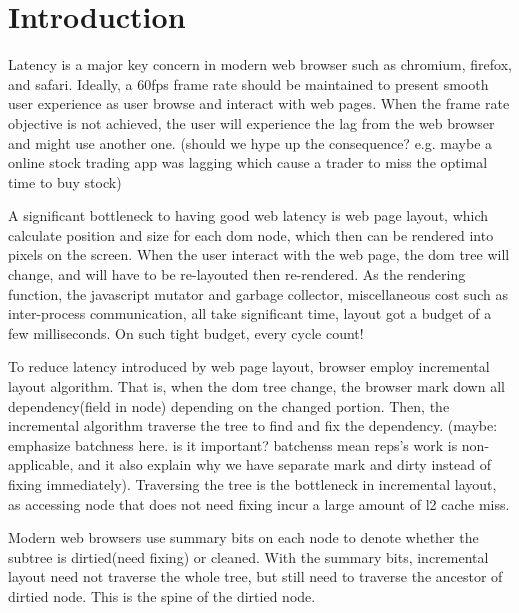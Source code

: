 \documentclass[format=acmsmall, review=false, screen=true]{acmart}
\begin{document}
\maketitle

\renewcommand{\shortauthors}{G. Zhou et al.}

\section{Introduction}
Latency is a major key concern in modern web browser such as chromium, firefox, and safari. Ideally, a 60fps frame rate should be maintained to present smooth user experience as user browse and interact with web pages. When the frame rate objective is not achieved, the user will experience the lag from the web browser and might use another one. (should we hype up the consequence? e.g. maybe a online stock trading app was lagging which cause a trader to miss the optimal time to buy stock)

A significant bottleneck to having good web latency is web page layout, which calculate position and size for each dom node, which then can be rendered into pixels on the screen. When the user interact with the web page, the dom tree will change, and will have to be re-layouted then re-rendered. As the rendering function, the javascript mutator and garbage collector, miscellaneous cost such as inter-process communication, all take significant time, layout got a budget of a few milliseconds. On such tight budget, every cycle count!

To reduce latency introduced by web page layout, browser employ incremental layout algorithm. That is, when the dom tree change, the browser mark down all dependency(field in node) depending on the changed portion. Then, the incremental algorithm traverse the tree to find and fix the dependency. (maybe: emphasize batchness here. is it important? batchenss mean reps's work is non-applicable, and it also explain why we have separate mark and dirty instead of fixing immediately). Traversing the tree is the bottleneck in incremental layout, as accessing node that does not need fixing incur a large amount of l2 cache miss.

Modern web browsers use summary bits on each node to denote whether the subtree is dirtied(need fixing) or cleaned. With the summary bits, incremental layout need not traverse the whole tree, but still need to traverse the ancestor of dirtied node. This is the spine of the dirtied node.
\end{document}

